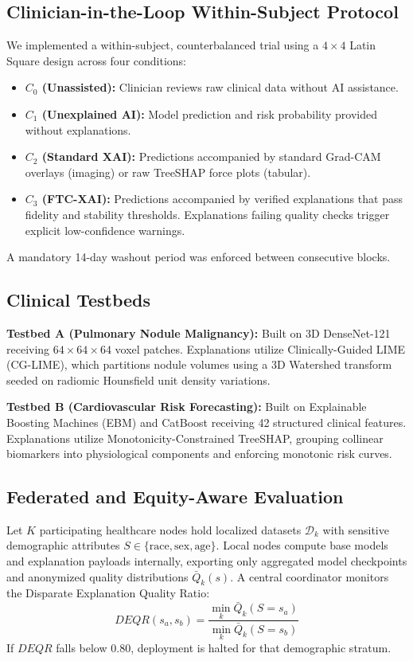 \documentclass[10pt,journal,compsoc]{IEEEtran}
\begin{document}
\subsection{Clinician-in-the-Loop Within-Subject Protocol}
We implemented a within-subject, counterbalanced trial using a $4 \times 4$ Latin Square design across four conditions:
\begin{itemize}
    \item \textbf{$C_0$ (Unassisted):} Clinician reviews raw clinical data without AI assistance.
    \item \textbf{$C_1$ (Unexplained AI):} Model prediction and risk probability provided without explanations.
    \item \textbf{$C_2$ (Standard XAI):} Predictions accompanied by standard Grad-CAM overlays (imaging) or raw TreeSHAP force plots (tabular).
    \item \textbf{$C_3$ (FTC-XAI):} Predictions accompanied by verified explanations that pass fidelity and stability thresholds. Explanations failing quality checks trigger explicit low-confidence warnings.
\end{itemize}
A mandatory 14-day washout period was enforced between consecutive blocks.

\subsection{Clinical Testbeds}
\textbf{Testbed A (Pulmonary Nodule Malignancy):} Built on 3D DenseNet-121 receiving $64 \times 64 \times 64$ voxel patches. Explanations utilize Clinically-Guided LIME (CG-LIME), which partitions nodule volumes using a 3D Watershed transform seeded on radiomic Hounsfield unit density variations.

\textbf{Testbed B (Cardiovascular Risk Forecasting):} Built on Explainable Boosting Machines (EBM) and CatBoost receiving 42 structured clinical features. Explanations utilize Monotonicity-Constrained TreeSHAP, grouping collinear biomarkers into physiological components and enforcing monotonic risk curves.

\subsection{Federated and Equity-Aware Evaluation}
Let $K$ participating healthcare nodes hold localized datasets $\mathcal{D}_k$ with sensitive demographic attributes $S \in \{\text{race}, \text{sex}, \text{age}\}$. Local nodes compute base models and explanation payloads internally, exporting only aggregated model checkpoints and anonymized quality distributions $\bar{Q}_k(s)$. A central coordinator monitors the Disparate Explanation Quality Ratio:
\begin{equation}
DEQR(s_a, s_b) = \frac{\min_k \bar{Q}_k(S = s_a)}{\min_k \bar{Q}_k(S = s_b)}
\end{equation}
If $DEQR$ falls below $0.80$, deployment is halted for that demographic stratum.
\end{document}
